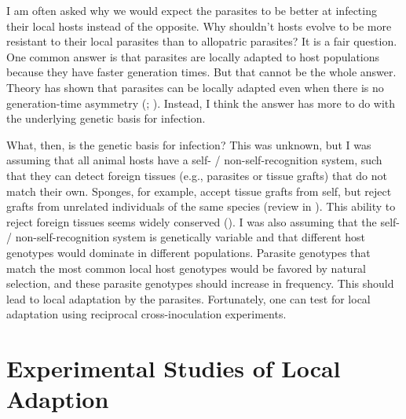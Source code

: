 \documentclass[
  american,
  letterpaper,
]{book}
\begin{document}
I am often asked why we would expect the parasites to be better at
infecting their local hosts instead of the opposite. Why shouldn't hosts
evolve to be more resistant to their local parasites than to allopatric
parasites? It is a fair question. One common answer is that parasites
are locally adapted to host populations because they have faster
generation times. But that cannot be the whole answer. Theory has shown
that parasites can be locally adapted even when there is no
generation-time asymmetry (; ). Instead, I
think the answer has more to do with the underlying genetic basis for
infection.

What, then, is the genetic basis for infection? This was unknown, but I
was assuming that all animal hosts have a self- / non-self-recognition
system, such that they can detect foreign tissues (e.g., parasites or
tissue grafts) that do not match their own. Sponges, for example, accept
tissue grafts from self, but reject grafts from unrelated individuals of
the same species (review in ). This ability to reject foreign tissues seems widely
conserved (). I was also assuming
that the self- / non-self-recognition system is genetically variable and
that different host genotypes would dominate in different populations.
Parasite genotypes that match the most common local host genotypes would
be favored by natural selection, and these parasite genotypes should
increase in frequency. This should lead to local adaptation by the
parasites. Fortunately, one can test for local adaptation using
reciprocal cross-inoculation experiments.

\section{Experimental Studies of Local
Adaption}\label{experimental-studies-of-local-adaption}
\end{document}
